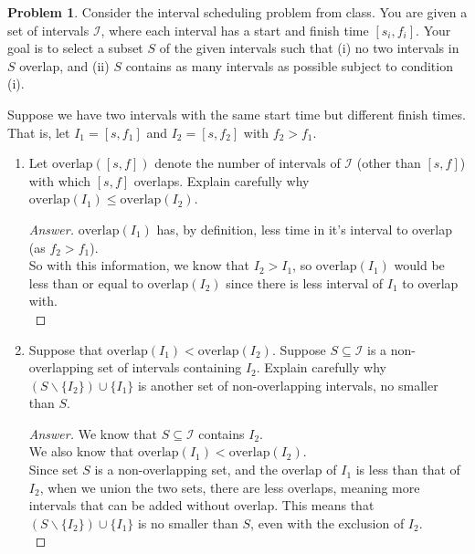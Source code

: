 \documentclass[11pt]{article}
\theoremstyle{definition}
\theoremstyle{definition}
\newtheorem{required}{Problem}
\theoremstyle{definition}
\begin{document}
\setcounter{required}{4}
\begin{required} 
Consider the interval scheduling problem from class. You are given a set of intervals $\mathcal{I}$, where each interval has a start and finish time $[s_i, f_i]$. Your goal is to select a subset $S$ of the given intervals such that (i) no two intervals in $S$ overlap, and (ii) $S$ contains as many intervals as possible subject to condition (i). 

Suppose we have two intervals with the same start time but different finish times. That is, let $I_{1} = [s, f_{1}]$ and $I_{2} = [s, f_{2}]$ with $f_{2} > f_{1}$. 
\begin{enumerate}[label=(\alph*)]
\item Let $\text{overlap}([s, f])$ denote the number of intervals of $\mathcal{I}$ (other than $[s, f]$) with which $[s, f]$ overlaps. Explain carefully why $\text{overlap}(I_{1}) \leq \text{overlap}(I_{2})$.
\begin{proof}[Answer]
$\text{overlap}(I_{1})$ has, by definition, less time in it's interval to overlap (as $f_{2} > f_{1}$).\\
So with this information, we know that $I_{2} > I_{1}$, so $\text{overlap}(I_{1})$ would be less than or equal to $\text{overlap}(I_{2})$ since there is less interval of $I_1$ to overlap with.\\
\end{proof}


\vskip 50pt
\item Suppose that $\text{overlap}(I_{1}) < \text{overlap}(I_{2})$. Suppose $S \subseteq \mathcal{I}$ is a non-overlapping set of intervals containing $I_2$. Explain carefully why $(S \backslash \{I_2\}) \cup \{I_1\}$ is another set of non-overlapping intervals, no smaller than $S$.
\begin{proof}[Answer]
We know that $S \subseteq \mathcal{I}$ contains $I_2$.\\
We also know that $\text{overlap}(I_{1}) < \text{overlap}(I_{2})$.\\
Since set $S$ is a non-overlapping set, and the overlap of $I_1$ is less than that of $I_2$, when we union the two sets, there are less overlaps, meaning more intervals that can be added without overlap. This means that $(S \backslash \{I_2\}) \cup \{I_1\}$ is no smaller than $S$, even with the exclusion of $I_2$.\\
\end{proof}
\end{enumerate}
\end{required}



\end{document}
